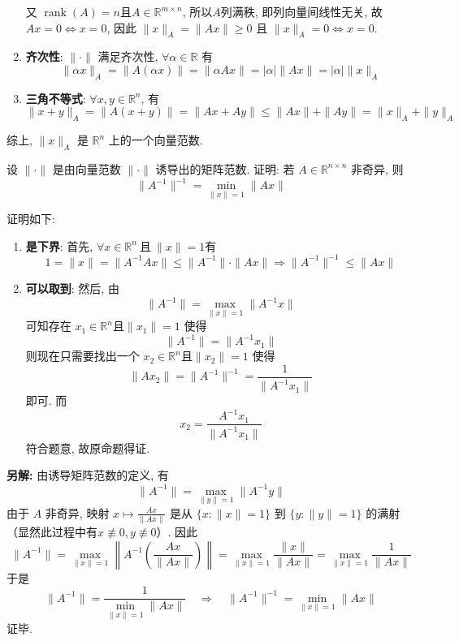 \documentclass[12pt, answers]{exam}     %
\newcommand{\anothersolution}{\par\noindent\textbf{另解:}}
\newcommand{\R}{\mathbb{R}}
\begin{document}
\begin{questions}
\begin{solution}
\begin{enumerate}
    又 $\operatorname{rank}(A) = n \text{且} A \in \R^{m \times n}$, 所以$A$列满秩, 即列向量间线性无关, 
    故 $A x = 0 \Longleftrightarrow x = 0$, 因此 $\|x\|_A = \|A x\| \geq 0$ 且 $\|x\|_A = 0 \Longleftrightarrow x = 0$. 

    \item \textbf{齐次性}: $\|\cdot\|$ 满足齐次性, $\forall \alpha \in \R$ 有
    \[
    \|\alpha x\|_A = \|A (\alpha x)\| = \|\alpha A x\| = |\alpha| \|A x\| = |\alpha| \|x\|_A
    \]

    \item \textbf{三角不等式}: $\forall x, y \in \R^n$, 有
    \[
    \|x + y\|_A = \|A(x + y)\| = \|A x + A y\| \leq \|A x\| + \|A y\| = \|x\|_A + \|y\|_A
    \]
\end{enumerate}
综上, $\|x\|_A$ 是 $\R^n$ 上的一个向量范数. 
\end{solution}

\question{}
设 $\|\cdot\|$ 是由向量范数 $\|\cdot\|$ 诱导出的矩阵范数. 证明: 若 $A \in \R^{n \times n}$ 非奇异, 则
\[
\|A^{-1}\|^{-1} = \min_{\|x\|=1} \|Ax\|
\]

\begin{solution}
证明如下:
\begin{enumerate}
    \item \textbf{是下界}: 首先, $\forall x \in \R^n \ \text{且}\ \|x\| = 1$有 \[ 1 = \|x\| = \|A^{-1} A x\| \leq \|A^{-1} \| \cdot \|Ax\| \Rightarrow \|A^{-1}\|^{-1} \leq \|Ax\| \]
    \item \textbf{可以取到}: 然后, 由 \[ \|A^{-1}\| = \max_{\|x\|=1} \|A^{-1} x\| \] 可知存在 $ x_1 \in \R^n \text{且} \|x_1\| = 1 $ 使得 \[ \|A^{-1}\| = \|A^{-1} x_1\| \]
    则现在只需要找出一个 $x_2 \in \R^n \text{且} \|x_2\| = 1$ 使得 \[ \|Ax_2\| = \|A^{-1}\|^{-1} = \frac{1}{\|A^{-1} x_1\|} \] 即可.
    而 \[ x_2 = \frac{A^{-1} x_1}{\|A^{-1} x_1\|} \] 符合题意, 故原命题得证.
    \end{enumerate}
\anothersolution{}
由诱导矩阵范数的定义, 有 
\[
\| A^{-1} \| = \max_{\| y \| = 1} \| A^{-1} y \|
\]
由于 \( A \) 非奇异, 映射 \( x \mapsto \frac{A x}{\| A x \|} \) 是从 \(\{x: \|x\|=1\}\) 到 \(\{y: \|y\|=1\}\) 的满射（显然此过程中有$x \not\equiv 0, y \not\equiv 0$）. 因此
\[
\| A^{-1} \| = \max_{\| x \| = 1} \left\| A^{-1} \left( \frac{A x}{\| A x \|} \right) \right\| = \max_{\| x \| = 1} \frac{\| x \|}{\| A x \|} = \max_{\| x \| = 1} \frac{1}{\| A x \|}
\]
于是
\[
\| A^{-1} \| = \frac{1}{\min_{\| x \| = 1} \| A x \|}
\quad \Rightarrow \quad
\| A^{-1} \|^{-1} = \min_{\| x \| = 1} \| A x \|
\]
证毕. 
\end{solution}


\end{questions}
\end{document}
